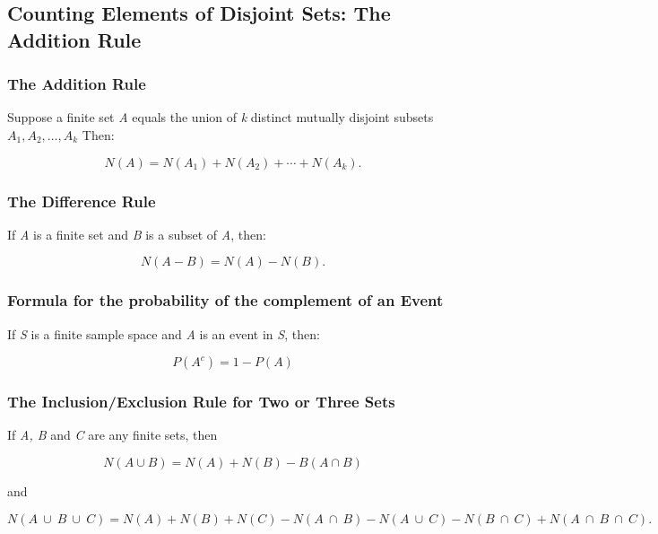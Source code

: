 \documentclass{article}
\begin{document}
\subsection{Counting Elements of Disjoint Sets: The Addition Rule}
\subsubsection*{The Addition Rule}
Suppose a finite set \textit{A} equals the union of \textit{k} distinct mutually disjoint subsets $A_1, A_2, \ldots , A_k$ Then:

\begin{equation*}
N(A) = N(A_1) + N(A_2) + \cdots + N(A_k).
\end{equation*}

\subsubsection*{The Difference Rule}
If \textit{A} is a finite set and \textit{B} is a subset of \textit{A}, then:

\begin{equation*}
N(A - B) = N(A) - N(B).
\end{equation*}

\subsubsection*{Formula for the probability of the complement of an Event}
If \textit{S} is a finite sample space and \textit{A} is an event in \textit{S}, then:

\begin{equation*}
P(A^c) = 1 - P(A)
\end{equation*}

\subsubsection*{The Inclusion/Exclusion Rule for Two or Three Sets}
If \textit{A, B} and \textit{C} are any finite sets, then

\begin{equation*}
N(A \cup B) = N(A) + N(B) - B(A \cap B)
\end{equation*}

and

\begin{equation*}
N(A \ \cup \ B \ \cup \ C) = N(A) + N(B) + N(C) - N(A \ \cap \ B) - N(A \ \cup \ C) - N(B \ \cap \ C) + N(A \ \cap \ B \ \cap \ C).
\end{equation*}
\end{document}
